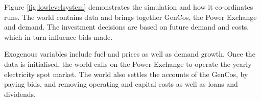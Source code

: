 Figure \ref{fig:lowlevelsystem} demonstrates the simulation and how it co-ordinates runs. The world contains data and brings together GenCos, the Power Exchange and demand. The investment decisions are based on future demand and costs, which in turn influence bids made.

Exogenous variables include fuel and  prices as well as demand growth. Once the data is initialised, the world calls on the Power Exchange to operate the yearly electricity spot market. The world also settles the accounts of the GenCos, by paying bids, and removing operating and capital costs as well as loans and dividends.















